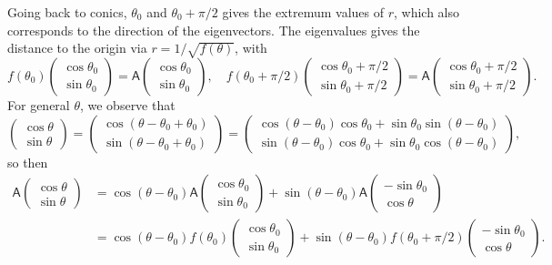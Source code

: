 \documentclass[letter-paper]{tufte-book}
\begin{document}
Going back to conics, $\theta_0$ and $\theta_0+\pi/2$ gives the extremum values
of $r$, which also corresponds to the direction of the eigenvectors. The
eigenvalues gives the distance to the origin via $r=1/\sqrt{f(\theta)}$, with
\begin{equation*}
	f(\theta_0)\begin{pmatrix}\cos\theta_0 \\ \sin\theta_0\end{pmatrix}
	=\mathsf{A}\begin{pmatrix}\cos\theta_0 \\ \sin\theta_0\end{pmatrix},\quad
	f(\theta_0+\pi/2)
	\begin{pmatrix}\cos\theta_0+\pi/2 \\ \sin\theta_0+\pi/2\end{pmatrix}
	=\mathsf{A}
	\begin{pmatrix}\cos\theta_0+\pi/2 \\ \sin\theta_0+\pi/2\end{pmatrix}.
\end{equation*}
For general $\theta$, we observe that
\begin{equation*}
	\begin{pmatrix}\cos\theta \\ \sin\theta\end{pmatrix}=
	\begin{pmatrix}\cos(\theta-\theta_0+\theta_0)
	 \\ \sin(\theta-\theta_0+\theta_0)\end{pmatrix}=
	 \begin{pmatrix}\cos(\theta-\theta_0)\cos\theta_0
	 +\sin\theta_0 \sin(\theta-\theta_0)
	 \\ \sin(\theta-\theta_0)\cos\theta_0 + \sin\theta_0 \cos(\theta-\theta_0)
	 \end{pmatrix},
\end{equation*}
so then
\begin{align*}
	\mathsf{A}\begin{pmatrix}\cos\theta \\ \sin\theta\end{pmatrix}
	&=\cos(\theta-\theta_0)\mathsf{A}
	\begin{pmatrix}\cos\theta_0 \\ \sin\theta_0\end{pmatrix}
	+\sin(\theta-\theta_0)\mathsf{A}
	\begin{pmatrix}-\sin\theta_0 \\ \cos\theta\end{pmatrix}\\
	&=\cos(\theta-\theta_0)f(\theta_0)
	\begin{pmatrix}\cos\theta_0 \\ \sin\theta_0\end{pmatrix}
	+\sin(\theta-\theta_0)f(\theta_0+\pi/2)
	\begin{pmatrix}-\sin\theta_0 \\ \cos\theta\end{pmatrix}.
\end{align*}
\end{document}
